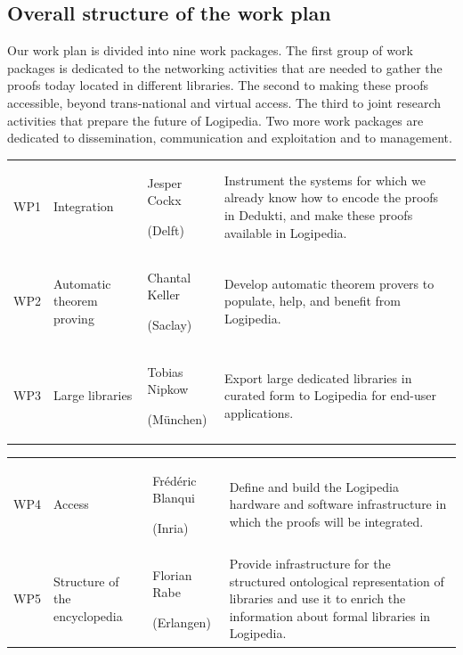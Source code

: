 \subsection*{Overall structure of the work plan}

Our work plan is divided into nine work packages.  The first group of
work packages is dedicated to the networking activities that are
needed to gather the proofs today located in different libraries.  The
second to making these proofs accessible, beyond trans-national and
virtual access.  The third to joint research activities that prepare
the future of Logipedia.  Two more work packages are dedicated to
dissemination, communication and exploitation and to management.

\begin{longtable*}{|p{0.05\textwidth}|p{0.15\textwidth}|p{0.17\textwidth}|p{0.55\textwidth}|}
\hline
{}\\
\hline
WP1
&
Integration &
Jesper Cockx

(Delft)
&
Instrument the systems for which we already know how to encode the
proofs in Dedukti, and make these proofs available in Logipedia.
\\
\hline
WP2
&
Automatic theorem proving
&
Chantal Keller

(Saclay)
& 
Develop automatic theorem provers to populate,
help, and benefit from Logipedia.
\\
\hline
WP3
&
Large libraries
&
Tobias Nipkow

(M\"unchen)
&
Export large dedicated libraries in curated form 
to Logipedia for end-user applications.
\\
\hline
\end{longtable*}

\begin{longtable*}{|p{0.05\textwidth}|p{0.15\textwidth}|p{0.17\textwidth}|p{0.55\textwidth}|}
\hline
{}\\
\hline
WP4
&
Access
&
Frédéric Blanqui

(Inria)
&
Define and build the Logipedia hardware and software infrastructure in
which the proofs will be integrated.
\\
\hline
WP5
&
Structure of the encyclopedia
&
Florian Rabe

(Erlangen)
&
Provide infrastructure for the structured ontological representation
of libraries and use it to enrich the information about formal
libraries in Logipedia.
\\
\hline
\end{longtable*}


